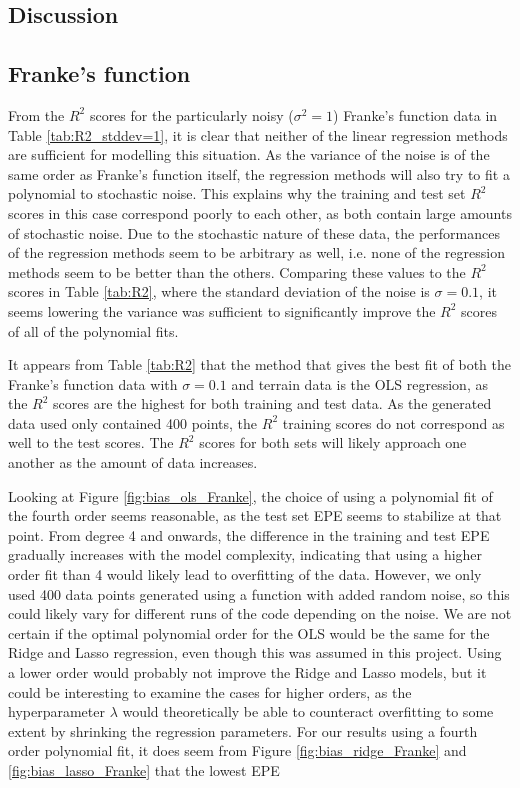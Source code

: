 \documentclass[a4paper, 10pt]{article}
\begin{document}
\begin{multicols}{2}


\section{Discussion}
\subsection{Franke's function}
From the $R^2$ scores for the particularly noisy ($\sigma^2 = 1$) Franke's function data in Table \ref{tab:R2_stddev=1}, it is clear that neither of the linear regression methods are sufficient for modelling this situation. As the variance of the noise is of the same order as Franke's function itself, the regression methods will also try to fit a polynomial to stochastic noise. This explains why the training and test set $R^2$ scores in this case correspond poorly to each other, as both contain large amounts of stochastic noise. Due to the stochastic nature of these data, the performances of the regression methods seem to be arbitrary as well, i.e. none of the regression methods seem to be better than the others. Comparing these values to the $R^2$ scores in Table \ref{tab:R2}, where the standard deviation of the noise is $\sigma=0.1$, it seems lowering the variance was sufficient to significantly improve the $R^2$ scores of all of the polynomial fits.

It appears from Table \ref{tab:R2} that the method that gives the best fit of both the Franke's function data with $\sigma=0.1$ and terrain data is the OLS regression, as the $R^2$ scores are the highest for both training and test data. As the generated data used only contained 400 points, the $R^2$ training scores do not correspond as well to the test scores. The $R^2$ scores for both sets will likely approach one another as the amount of data increases. 

Looking at Figure \ref{fig:bias_ols_Franke}, the choice of using a polynomial fit of the fourth order seems reasonable, as the test set EPE seems to stabilize at that point. From degree 4 and onwards, the difference in the training and test EPE gradually increases with  the model complexity, indicating that using a higher order fit than 4 would likely lead to overfitting of the data. However, we only used 400 data points generated using a function with added random noise, so this could likely vary for different runs of the code depending on the noise.  We are not certain if the optimal polynomial order for the OLS would be the same for the Ridge and Lasso regression, even though this was assumed in this project. Using a lower order would probably not improve the Ridge and Lasso models, but it could be interesting to examine the cases for higher orders, as the hyperparameter $\lambda$ would theoretically be able to counteract overfitting to some extent by shrinking the regression parameters.  For our results using a fourth order polynomial fit, it does seem from Figure \ref{fig:bias_ridge_Franke} and \ref{fig:bias_lasso_Franke} that the lowest EPE 



\end{multicols}
\end{document}
